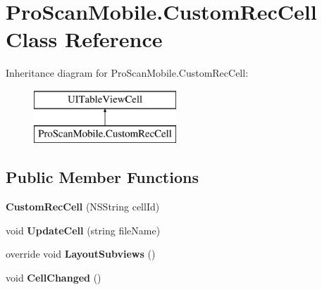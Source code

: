 \hypertarget{class_pro_scan_mobile_1_1_custom_rec_cell}{\section{Pro\-Scan\-Mobile.\-Custom\-Rec\-Cell Class Reference}
\label{class_pro_scan_mobile_1_1_custom_rec_cell}
}
Inheritance diagram for Pro\-Scan\-Mobile.\-Custom\-Rec\-Cell\-:\begin{figure}[H]
\begin{center}
\leavevmode
\includegraphics[height=2.000000cm]{class_pro_scan_mobile_1_1_custom_rec_cell}
\end{center}
\end{figure}
\subsection*{Public Member Functions}
\begin{DoxyCompactItemize}
\item 
\hypertarget{class_pro_scan_mobile_1_1_custom_rec_cell_a0d7e96ccd9839150b405e35e4f77ceee}{{\bfseries Custom\-Rec\-Cell} (N\-S\-String cell\-Id)}\label{class_pro_scan_mobile_1_1_custom_rec_cell_a0d7e96ccd9839150b405e35e4f77ceee}

\item 
\hypertarget{class_pro_scan_mobile_1_1_custom_rec_cell_a44e7381ca311c73532a3d3dfd284b357}{void {\bfseries Update\-Cell} (string file\-Name)}\label{class_pro_scan_mobile_1_1_custom_rec_cell_a44e7381ca311c73532a3d3dfd284b357}

\item 
\hypertarget{class_pro_scan_mobile_1_1_custom_rec_cell_abc36c0164227092e72a0698f2b2d4205}{override void {\bfseries Layout\-Subviews} ()}\label{class_pro_scan_mobile_1_1_custom_rec_cell_abc36c0164227092e72a0698f2b2d4205}

\item 
\hypertarget{class_pro_scan_mobile_1_1_custom_rec_cell_a1a3f6f587f1c1b5a15b64294252a90f2}{void {\bfseries Cell\-Changed} ()}\label{class_pro_scan_mobile_1_1_custom_rec_cell_a1a3f6f587f1c1b5a15b64294252a90f2}

\end{DoxyCompactItemize}
